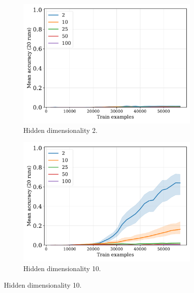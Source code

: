 \documentclass{article}
\begin{document}
\begin{figure}[H]
  \centering

  \begin{subfigure}{0.45\linewidth}
    \includegraphics[width=1\textwidth]{./fuzzy-lm-vocab20-pretrain-3tasks-train_size-embed_dim-hidden_dim=2.pdf}
    \caption{Hidden dimensionality 2.}
  \end{subfigure}
  \hfill
  \begin{subfigure}{0.45\linewidth}
    \includegraphics[width=1\textwidth]{./fuzzy-lm-vocab20-pretrain-3tasks-train_size-embed_dim-hidden_dim=10.pdf}
    \caption{Hidden dimensionality 10.}
  \end{subfigure}

  \vspace{24pt}


\end{figure}
\end{document}
